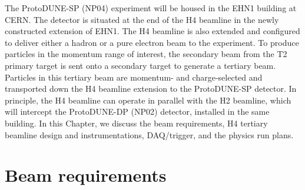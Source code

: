 The ProtoDUNE-SP (NP04) experiment will be housed in the EHN1 building at CERN. The detector is situated at the end of the H4 beamline in the newly constructed extension of EHN1. The H4 beamline is also extended and configured to deliver either a hadron or a pure electron beam to the experiment. To produce particles in the momentum range of interest, the secondary beam from the T2 primary target is sent onto a secondary target to generate a tertiary beam. Particles in this tertiary beam are momentum- and charge-selected and transported down the H4 beamline extension to the ProtoDUNE-SP detector. 
In principle, the H4 beamline can operate in parallel with the H2 beamline, which will intercept the ProtoDUNE-DP (NP02) detector, installed in the same building. In this Chapter, we discuss the beam requirements, H4 tertiary beamline design and instrumentations, DAQ/trigger, and the physics run plans.  

\section{Beam requirements}
\label{sec:beamrequirements}


